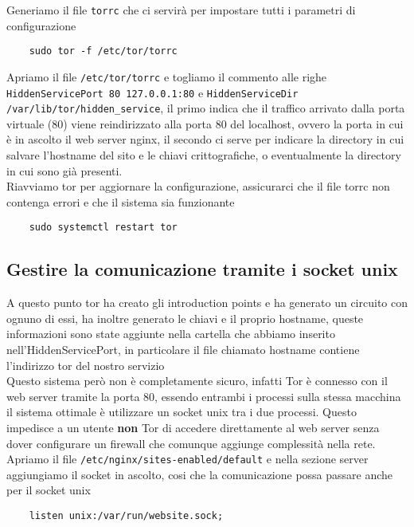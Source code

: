 Generiamo il file \lstinline{torrc} che ci servirà per impostare tutti i parametri di configurazione 
\begin{lstlisting}
    sudo tor -f /etc/tor/torrc
\end{lstlisting}

Apriamo il file \lstinline{/etc/tor/torrc} e togliamo il commento alle righe \lstinline{HiddenServicePort 80 127.0.0.1:80} e \lstinline{HiddenServiceDir /var/lib/tor/hidden_service}, il primo indica che il traffico arrivato dalla porta virtuale (80) viene reindirizzato alla porta 80 del localhost, ovvero la porta in cui è in ascolto il web server nginx, il secondo ci serve per indicare la directory in cui salvare l'hostname del sito e le chiavi crittografiche, o eventualmente la directory in cui sono già presenti. \\
Riavviamo tor per aggiornare la configurazione, assicurarci che il file torrc non contenga errori e che il sistema sia funzionante
\begin{lstlisting}
    sudo systemctl restart tor
\end{lstlisting}

\subsection{Gestire la comunicazione tramite i socket unix}
A questo punto tor ha creato gli introduction points e ha generato un circuito con ognuno di essi, ha inoltre generato le chiavi e il proprio hostname, queste informazioni sono state aggiunte nella cartella che abbiamo inserito nell'HiddenServicePort, in particolare il file chiamato hostname contiene l'indirizzo tor del nostro servizio \cite{SetupOnionService} \\
Questo sistema però non è completamente sicuro, infatti Tor è connesso con il web server tramite la porta 80, essendo entrambi i processi sulla stessa macchina il sistema ottimale è utilizzare un socket unix tra i due processi. 
Questo impedisce a un utente \textbf{non} Tor di accedere direttamente al web server senza dover configurare un firewall che comunque aggiunge complessità nella rete. \\
Apriamo il file \lstinline{/etc/nginx/sites-enabled/default} e nella sezione server aggiungiamo il socket in ascolto, cosi che la comunicazione possa passare anche per il socket unix
\begin{lstlisting}
    listen unix:/var/run/website.sock;
\end{lstlisting}

